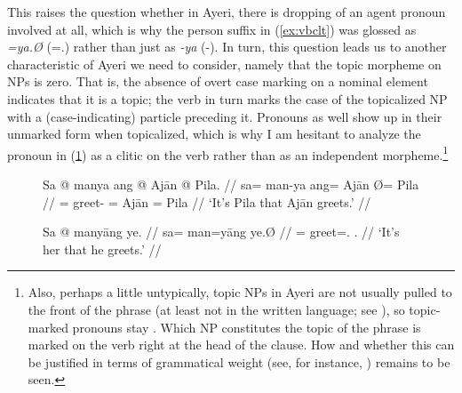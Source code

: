 This raises the question whether in Ayeri, there is dropping of an agent
pronoun involved at all, which is why the person suffix in (\ref{ex:vbclt}) was
glossed as \emph{=ya.Ø} (\mbox{=\TsgM{}.\Top{}}) rather than just as \emph{-ya}
(-\TsgM{}). In turn, this question leads us to another characteristic of Ayeri
we need to consider, namely that the topic morpheme on NPs is zero.
That is, the absence of overt case marking on a nominal element indicates that
it is a topic; the verb in turn marks the case of the topicalized NP with a
(case-indicating) particle preceding it. Pronouns as well show up in their
unmarked form when topicalized, which is why I am hesitant to analyze the
pronoun in (\ref{ex:protop}) as a clitic on the verb rather than as an
independent morpheme.\footnote{Also, perhaps a little untypically, topic NPs in
Ayeri are not usually pulled to the front of the phrase (at least not in the
written language; see \cite[120--122]{lehmann2015}), so topic-marked pronouns
stay . Which NP constitutes the topic of the phrase is marked on
the verb right at the head of the clause. How and whether this can be justified
in terms of grammatical weight (see, for instance, \cite[95--98]{wasow1997})
remains to be seen.}

\begin{figure}[h]
\pex %
\a\label{ex:fullsntc}\begingl
	\gla Sa @ manya ang @ Ajān {} @ Pila. //
	\glb sa= man-ya ang= ​Ajān Ø= ​Pila //
	\glc \PatT{}= greet-\TsgM{} \Aarg{}= ​Ajān \Top{}= ​Pila //
	\glft `It's Pila that Ajān greets.' //
\endgl

\a\label{ex:protop}\begingl
	\gla Sa @ manyāng ye. //
	\glb sa= man=yāng ye.Ø //
	\glc \PatT{}= greet=\TsgM{}.\Aarg{} \TsgF{}.\Top{} //
	\glft `It's her that he greets.' //
\endgl
\xe
\end{figure}

